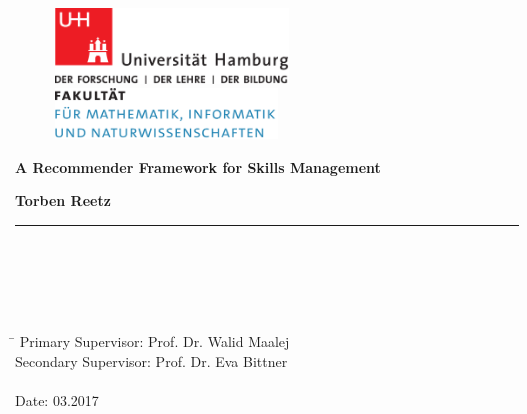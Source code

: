\begin{titlepage}

  \setcounter{page}{-1}

	\begin{figure}[h]
		\begin{minipage}[b]{62mm}
			\includegraphics[width=62mm]{images/unilogo}
		\end{minipage}
		\hspace{4cm}
		\begin{minipage}[b]{59mm}
			\includegraphics[width=59mm]{images/minlogo}
		\end{minipage}
	\end{figure}

	\vfill

	\begin{center}
		\vspace{14mm}
		\noindent \textbf{\huge
		A Recommender Framework for Skills Management \\
		}
		\vspace{14mm}
	\end{center}

	\vfill

	\noindent \textbf{Torben Reetz} \\
	\noindent \rule{\textwidth}{0.4mm}
	 \\
	 \\
	 \\
	 \\
	\begin{tabbing}
	\hspace{8em} \=  \kill
	Primary Supervisor: Prof. Dr. Walid Maalej \\
	Secondary Supervisor: Prof. Dr. Eva Bittner \\
	~ \\
	Date: 03.2017
	\end{tabbing}


\end{titlepage}
